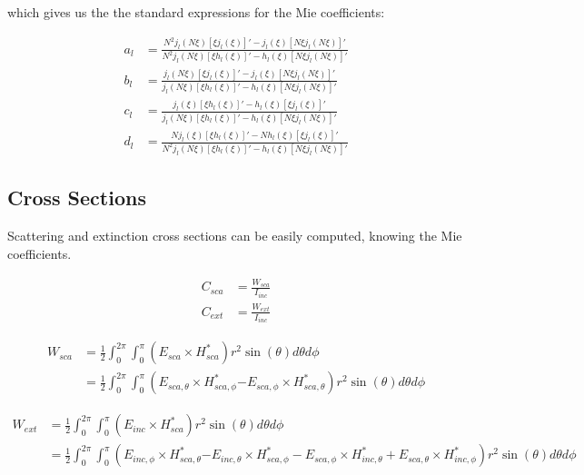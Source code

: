         which gives us the the standard expressions for the Mie coefficients:

        \begin{align}
            a_l &= \frac{N^2 j_l(N\xi)[\xi j_l(\xi)]' - j_l(\xi)[N\xi j_l(N \xi)]'}{N^2 j_l(N\xi)[\xi h_l(\xi)]' - h_l(\xi)[N\xi j_l(N \xi)]'}\\
            b_l &= \frac{j_l(N\xi)[\xi j_l(\xi)]' - j_l(\xi)[N\xi j_l(N\xi)]'}{j_l(N\xi)[\xi h_l(\xi)]' - h_l(\xi)[N\xi j_l(N\xi)]'}\\
            c_l &= \frac{j_l(\xi)[\xi h_l(\xi)]' - h_l(\xi)[\xi j_l(\xi)]'}{j_l(N\xi)[\xi h_l(\xi)]' - h_l(\xi)[N\xi j_l(N\xi)]'}\\
            d_l &= \frac{Nj_l(\xi)[\xi h_l(\xi)]' - N h_l(\xi)[\xi j_l(\xi)]'}{N^2 j_l(N\xi)[\xi h_l(\xi)]' - h_l(\xi)[N\xi j_l(N\xi)]'}
        \end{align}

    \subsection{Cross Sections}
        Scattering and extinction cross sections can be easily computed, knowing the Mie coefficients.

        \begin{align}
            C_{sca} &= \frac{W_{sca}}{I_{inc}} \\
            C_{ext} &= \frac{W_{ext}}{I_{inc}}
        \end{align}

        \begin{align}
            W_{sca} &= \frac{1}{2}\int_0^{2\pi}\int_0^\pi \left(E_{sca} \times H^*_{sca}\right)r^2\sin(\theta)d\theta d\phi \\
             &= \frac{1}{2}\int_0^{2\pi}\int_0^\pi \left(E_{sca,\theta} \times H^*_{sca,\phi}\right.
                            \left.- E_{sca,\phi} \times H^*_{sca,\theta}\right)r^2\sin(\theta)d\theta d\phi
        \end{align}

        \begin{align}
            W_{ext} &= \frac{1}{2}\int_0^{2\pi}\int_0^\pi \left(E_{inc} \times H^*_{sca}\right)r^2\sin(\theta)d\theta d\phi \\
             &= \frac{1}{2}\int_0^{2\pi}\int_0^\pi \left(E_{inc,\phi} \times H^*_{sca,\theta}\right.
                            \left.- E_{inc,\theta} \times H^*_{sca,\phi} - E_{sca,\phi} \times H^*_{inc,\theta}
                                           + E_{sca,\theta} \times H^*_{inc,\phi}\right)r^2\sin(\theta)d\theta d\phi
        \end{align}


